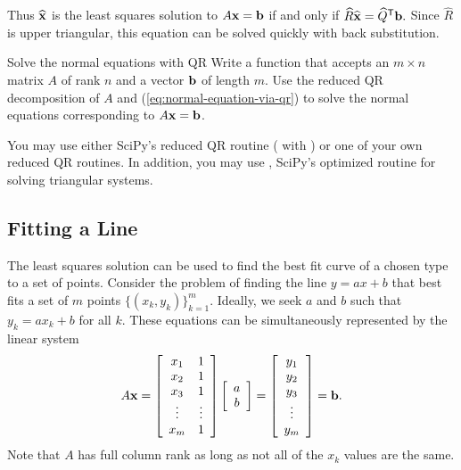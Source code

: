 Thus $\widehat{\mathbf{x}}$ is the least squares solution to $A\mathbf{x}=\mathbf{b}$ if and only if $\widehat{R}\widehat{\mathbf{x}} = \widehat{Q}^{\mathsf T}\mathbf{b}.$
Since $\widehat{R}$ is upper triangular, this equation can be solved quickly with back substitution.

\begin{problem}{Solve the normal equations with QR}
Write a function that accepts an $m \times n$ matrix $A$ of rank $n$ and a vector $\mathbf{b}$ of length $m$.
Use the reduced QR decomposition of $A$ and (\ref{eq:normal-equation-via-qr}) to solve the normal equations corresponding to $A\mathbf{x} = \mathbf{b}$.

You may use either SciPy's reduced QR routine ( with ) or one of your own reduced QR routines.
In addition, you may use , SciPy's optimized routine for solving triangular systems.
\label{prob:lstsq-via-qr}
\end{problem}

\subsection*{Fitting a Line} %

The least squares solution can be used to find the best fit curve of a chosen type to a set of points.
Consider the problem of finding the line $y = ax + b$ that best fits a set of $m$ points $\{(x_k, y_k)\}_{k=1}^m$.
Ideally, we seek $a$ and $b$ such that $y_k = ax_k + b$ for all $k$.
These equations can be simultaneously represented by the linear system
\begin{equation}
A\mathbf{x} =
\left[\begin{array}{cc}
x_1 & 1 \\
x_2 & 1 \\
x_3 & 1 \\
\vdots & \vdots \\
x_m & 1
\end{array}\right]
\left[\begin{array}{c} a \\ b \end{array}\right]
=
\left[\begin{array}{c} y_1 \\ y_2 \\ y_3 \\ \vdots \\ y_m \end{array}\right]
= \mathbf{b}.
\label{eq:linear-least-squares}
\end{equation}
%
Note that $A$ has full column rank as long as not all of the $x_k$ values are the same.


